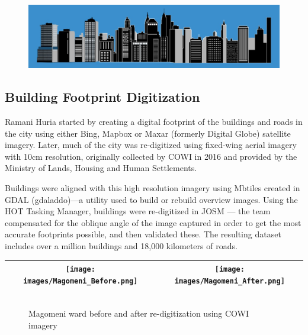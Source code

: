 \documentclass[a4paper,12pt,twoside]{article}
\begin{document}
\begin{figure}[h]
   \centering
   \includegraphics[width=1\textwidth]{images/Silhouette.jpeg}
\end{figure}

\newpage
\subsection{Building Footprint Digitization}
\begin{multicols}{2}
Ramani Huria started by creating a digital footprint of the buildings and roads in the city using either Bing, Mapbox or Maxar (formerly Digital Globe) satellite imagery. Later, much of the city was re-digitized using fixed-wing aerial imagery with 10cm resolution,  originally collected by COWI in 2016 and provided by the Ministry of Lands, Housing and Human Settlements. 

Buildings were aligned with this high resolution imagery using Mbtiles created in GDAL (gdaladdo)---a utility used to build or rebuild overview images. Using the HOT Tasking Manager, buildings were re-digitized in JOSM --- the team compensated for the oblique angle of the image captured in order to get the most accurate footprints possible, and then validated these. The resulting dataset includes over a million buildings and 18,000 kilometers of roads. 

\end{multicols}

\begin{tabular}{|c@{}c|}
	\hline
	
	\texttt{[image: images/Magomeni\_Before.png]}&%
	\texttt{[image: images/Magomeni\_After.png]}\\
	\hline
\end{tabular}
 \begin{figure}[h]
	\caption{Magomeni ward before and after re-digitization using COWI imagery}
	\centering
	\includegraphics[width=0\textwidth]{images/Building_Footprint_Digitization.png}
\end{figure}
\end{document}
